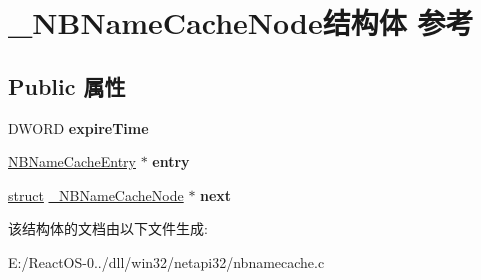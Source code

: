 \hypertarget{struct___n_b_name_cache_node}{}\section{\+\_\+\+N\+B\+Name\+Cache\+Node结构体 参考}
\label{struct___n_b_name_cache_node}
\subsection*{Public 属性}
\begin{DoxyCompactItemize}
\item 
\mbox{\label{struct___n_b_name_cache_node_ae1f9b298db67bbb0c3bfd147e2a98719}} 
D\+W\+O\+RD {\bfseries expire\+Time}
\item 
\mbox{\label{struct___n_b_name_cache_node_ae15d13315ff0e5adc5b1dfd399b730f1}} 
\hyperlink{struct___n_b_name_cache_entry}{N\+B\+Name\+Cache\+Entry} $\ast$ {\bfseries entry}
\item 
\mbox{\label{struct___n_b_name_cache_node_aacde85455381a8f9f2871c40d2f3ff1c}} 
\hyperlink{interfacestruct}{struct} \hyperlink{struct___n_b_name_cache_node}{\+\_\+\+N\+B\+Name\+Cache\+Node} $\ast$ {\bfseries next}
\end{DoxyCompactItemize}


该结构体的文档由以下文件生成\+:\begin{DoxyCompactItemize}
\item 
E\+:/\+React\+O\+S-\/0../dll/win32/netapi32/nbnamecache.\+c\end{DoxyCompactItemize}
